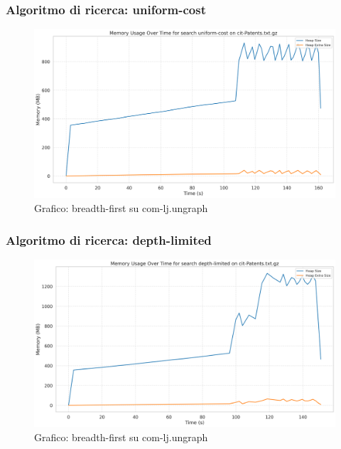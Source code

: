 \documentclass{article}
\begin{document}
\subsubsection{Algoritmo di ricerca: uniform-cost}
\begin{figure}[h]\centering
\includegraphics[width=\textwidth]{../plots/cit-Patents_uniform-cost.png}
\caption{Grafico: breadth-first su com-lj.ungraph}
\end{figure}
\subsubsection{Algoritmo di ricerca: depth-limited}
\begin{figure}[h]\centering
\includegraphics[width=\textwidth]{../plots/cit-Patents_depth-limited.png}
\caption{Grafico: breadth-first su com-lj.ungraph}
\end{figure}
\end{document}
